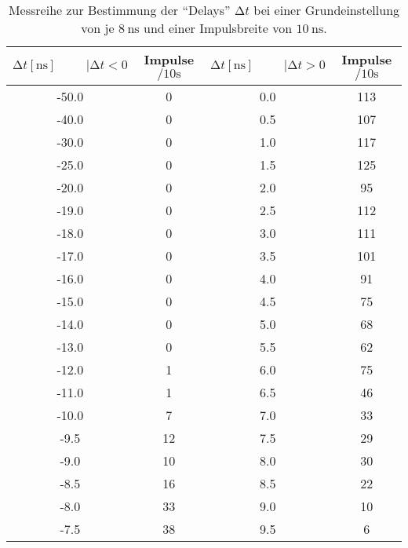 \begin{table}
    \centering
    \caption{Messreihe zur Bestimmung der \enquote{Delays} $\increment t$ bei einer Grundeinstellung von je $\SI{8}{\nano\second}$ und einer Impulsbreite von $\SI{10}{\nano\second}$. } 
    \label{tab:MessreiheDelay10ns}
    \begin{tabular}{c c || c c}
        \toprule
        $\increment t [\si{\nano\second}] \hspace{1cm}|\increment t < 0 $ & Impulse $\si{\per{10}\second} $ & $\increment t [\si{\nano\second}] \hspace{1cm}|\increment t > 0 $ & Impulse $\si{\per{10}\second}$ \\
        \midrule
        -50.0    &   0      &    0.0       &   113    \\
        -40.0    &   0      &    0.5     &   107    \\
        -30.0    &   0      &    1.0       &   117    \\
        -25.0    &   0      &    1.5     &   125    \\
        -20.0    &   0      &    2.0       &   95    \\
        -19.0    &   0      &    2.5     &   112    \\
        -18.0    &   0      &    3.0       &   111    \\
        -17.0    &   0      &    3.5     &   101    \\
        -16.0    &   0      &    4.0       &   91    \\
        -15.0    &   0      &    4.5     &   75    \\
        -14.0    &   0      &    5.0       &   68    \\
        -13.0    &   0      &    5.5     &   62    \\
        -12.0    &   1      &    6.0       &   75    \\
        -11.0    &   1      &    6.5     &   46    \\
        -10.0    &   7      &    7.0       &   33    \\
        -9.5   &   12     &    7.5     &   29    \\
        -9.0     &   10     &    8.0       &   30    \\
        -8.5   &   16     &    8.5     &   22    \\
        -8.0     &   33     &    9.0       &   10    \\
        -7.5   &   38     &    9.5     &   6    \\

\end{tabular}
\end{table}
